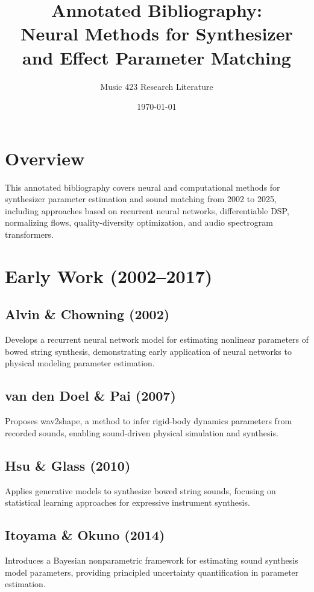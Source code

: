\documentclass[12pt]{article}
\title{Annotated Bibliography:\\Neural Methods for Synthesizer and Effect Parameter Matching}
\author{Music 423 Research Literature}
\date{\today}
\begin{document}
\maketitle

\section*{Overview}
This annotated bibliography covers neural and computational methods for synthesizer parameter estimation and sound matching from 2002 to 2025, including approaches based on recurrent neural networks, differentiable DSP, normalizing flows, quality-diversity optimization, and audio spectrogram transformers.

\section{Early Work (2002--2017)}

\subsection*{Alvin \& Chowning (2002) \cite{Alvin2002}}
Develops a recurrent neural network model for estimating nonlinear parameters of bowed string synthesis, demonstrating early application of neural networks to physical modeling parameter estimation.

\subsection*{van den Doel \& Pai (2007) \cite{vandenDoel2007}}
Proposes wav2shape, a method to infer rigid-body dynamics parameters from recorded sounds, enabling sound-driven physical simulation and synthesis.

\subsection*{Hsu \& Glass (2010) \cite{Hsu2010}}
Applies generative models to synthesize bowed string sounds, focusing on statistical learning approaches for expressive instrument synthesis.

\subsection*{Itoyama \& Okuno (2014) \cite{ItoyamaOkuno2014}}
Introduces a Bayesian nonparametric framework for estimating sound synthesis model parameters, providing principled uncertainty quantification in parameter estimation.
\end{document}
